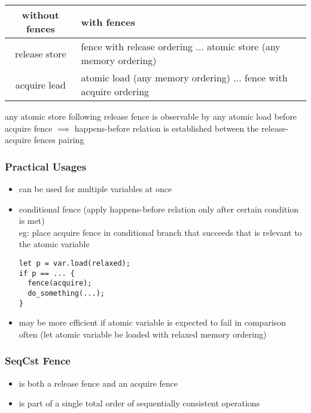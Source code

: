\documentclass[8pt]{extarticle}
\begin{document}
\begin{multicols*}{2}
    \begin{tabular}{| c | p{50mm} |}
    \hline
    \textbf{without fences} & \textbf{with fences} \\
    \hline
    release store & fence with release ordering \newline ... \newline atomic store (any memory ordering) \\
    \hline
    acquire lead & atomic load (any memory ordering) \newline ... \newline fence with acquire ordering \\
    \hline
    \end{tabular}

    any atomic store following release fence is observable by any atomic load before acquire fence $\implies$ happens-before relation is established between the release-acquire fences pairing

    \subsubsection{Practical Usages}
    \begin{itemize}
    \item can be used for multiple variables at once
    \item conditional fence (apply happens-before relation only after certain condition is met)\\
      eg: place acquire fence in conditional branch that succeeds that is relevant to the atomic variable

\begin{verbatim}
let p = var.load(relaxed);
if p == ... {
  fence(acquire);
  do_something(...);
}
\end{verbatim}

    \item may be more efficient if atomic variable is expected to fail in comparison often (let atomic variable be loaded with relaxed memory ordering)
    \end{itemize}

    \subsubsection{SeqCst Fence}
    \begin{itemize}
    \item is both a release fence and an acquire fence
    \item is part of a single total order of sequentially consistent operations
    \end{itemize}


\end{multicols*}
\end{document}
